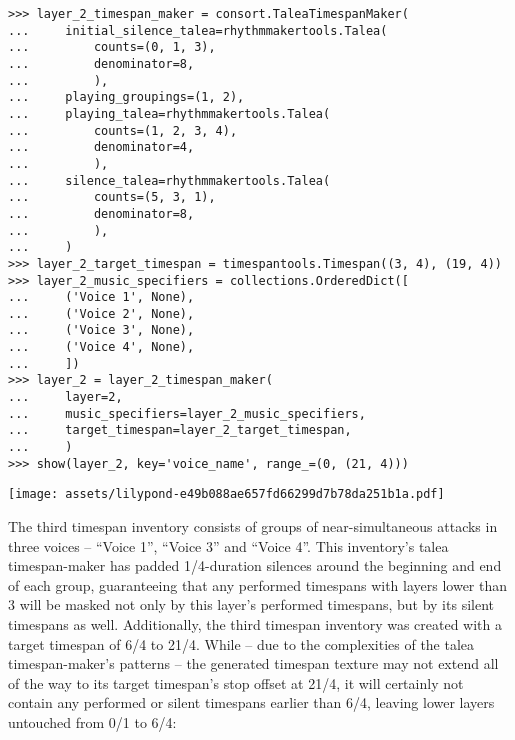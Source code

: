 \begin{comment}
<abjad>
layer_2_timespan_maker = consort.TaleaTimespanMaker(
    initial_silence_talea=rhythmmakertools.Talea(
        counts=(0, 1, 3),
        denominator=8,
        ),
    playing_groupings=(1, 2),
    playing_talea=rhythmmakertools.Talea(
        counts=(1, 2, 3, 4),
        denominator=4,
        ),
    silence_talea=rhythmmakertools.Talea(
        counts=(5, 3, 1),
        denominator=8,
        ),
    )
layer_2_target_timespan = timespantools.Timespan((3, 4), (19, 4))
layer_2_music_specifiers = collections.OrderedDict([
    ('Voice 1', None),
    ('Voice 2', None),
    ('Voice 3', None),
    ('Voice 4', None),
    ])
layer_2 = layer_2_timespan_maker(
    layer=2,
    music_specifiers=layer_2_music_specifiers,
    target_timespan=layer_2_target_timespan,
    )
show(layer_2, key='voice_name', range_=(0, (21, 4)))
</abjad>
\end{comment}

\begin{abjadbookoutput}
\begin{singlespacing}
\vspace{-0.5\baselineskip}
\begin{lstlisting}
>>> layer_2_timespan_maker = consort.TaleaTimespanMaker(
...     initial_silence_talea=rhythmmakertools.Talea(
...         counts=(0, 1, 3),
...         denominator=8,
...         ),
...     playing_groupings=(1, 2),
...     playing_talea=rhythmmakertools.Talea(
...         counts=(1, 2, 3, 4),
...         denominator=4,
...         ),
...     silence_talea=rhythmmakertools.Talea(
...         counts=(5, 3, 1),
...         denominator=8,
...         ),
...     )
>>> layer_2_target_timespan = timespantools.Timespan((3, 4), (19, 4))
>>> layer_2_music_specifiers = collections.OrderedDict([
...     ('Voice 1', None),
...     ('Voice 2', None),
...     ('Voice 3', None),
...     ('Voice 4', None),
...     ])
>>> layer_2 = layer_2_timespan_maker(
...     layer=2,
...     music_specifiers=layer_2_music_specifiers,
...     target_timespan=layer_2_target_timespan,
...     )
>>> show(layer_2, key='voice_name', range_=(0, (21, 4)))
\end{lstlisting}
\noindent\texttt{[image: assets/lilypond-e49b088ae657fd66299d7b78da251b1a.pdf]}
\end{singlespacing}
\end{abjadbookoutput}

\noindent The third timespan inventory consists of groups of near-simultaneous
attacks in three voices -- \enquote{Voice 1}, \enquote{Voice 3} and
\enquote{Voice 4}. This inventory's talea timespan-maker has padded
1/4-duration silences around the beginning and end of each group, guaranteeing
that any performed timespans with layers lower than 3 will be masked not only
by this layer's performed timespans, but by its silent timespans as well.
Additionally, the third timespan inventory was created with a target timespan
of 6/4 to 21/4. While -- due to the complexities of the talea timespan-maker's
patterns -- the generated timespan texture may not extend all of the way to its
target timespan's stop offset at 21/4, it will certainly not contain any
performed or silent timespans earlier than 6/4, leaving lower layers untouched
from 0/1 to 6/4:

